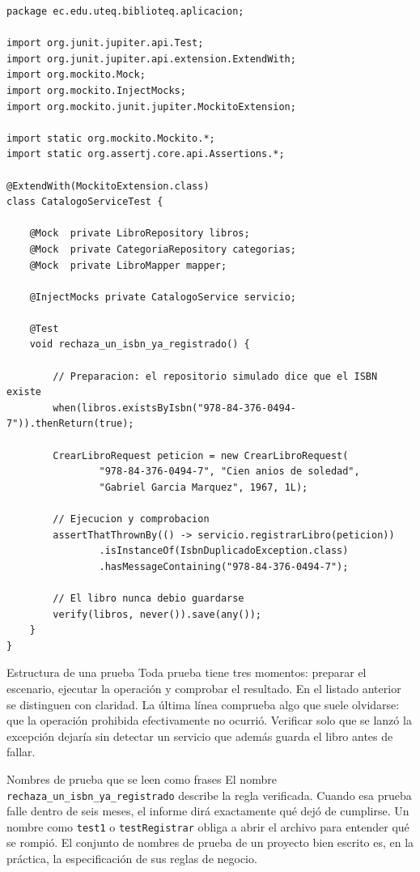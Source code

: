 \documentclass[11pt,a4paper,openany]{book}
\begin{document}
\begin{lstlisting}[style=java,caption={Prueba unitaria de la regla del ISBN duplicado.},label={lst:prueba-servicio}]
package ec.edu.uteq.biblioteq.aplicacion;

import org.junit.jupiter.api.Test;
import org.junit.jupiter.api.extension.ExtendWith;
import org.mockito.Mock;
import org.mockito.InjectMocks;
import org.mockito.junit.jupiter.MockitoExtension;

import static org.mockito.Mockito.*;
import static org.assertj.core.api.Assertions.*;

@ExtendWith(MockitoExtension.class)
class CatalogoServiceTest {

	@Mock  private LibroRepository libros;
	@Mock  private CategoriaRepository categorias;
	@Mock  private LibroMapper mapper;

	@InjectMocks private CatalogoService servicio;

	@Test
	void rechaza_un_isbn_ya_registrado() {

		// Preparacion: el repositorio simulado dice que el ISBN existe
		when(libros.existsByIsbn("978-84-376-0494-7")).thenReturn(true);

		CrearLibroRequest peticion = new CrearLibroRequest(
				"978-84-376-0494-7", "Cien anios de soledad",
				"Gabriel Garcia Marquez", 1967, 1L);

		// Ejecucion y comprobacion
		assertThatThrownBy(() -> servicio.registrarLibro(peticion))
				.isInstanceOf(IsbnDuplicadoException.class)
				.hasMessageContaining("978-84-376-0494-7");

		// El libro nunca debio guardarse
		verify(libros, never()).save(any());
	}
}
\end{lstlisting}

\begin{cajadefinicion}{Estructura de una prueba}
	Toda prueba tiene tres momentos: preparar el escenario, ejecutar la operación y comprobar el resultado. En el listado anterior se distinguen con claridad. La última línea comprueba algo que suele olvidarse: que la operación prohibida efectivamente no ocurrió. Verificar solo que se lanzó la excepción dejaría sin detectar un servicio que además guarda el libro antes de fallar.
\end{cajadefinicion}

\begin{cajabuenas}{Nombres de prueba que se leen como frases}
	El nombre \texttt{rechaza\_un\_isbn\_ya\_registrado} describe la regla verificada. Cuando esa prueba falle dentro de seis meses, el informe dirá exactamente qué dejó de cumplirse. Un nombre como \texttt{test1} o \texttt{testRegistrar} obliga a abrir el archivo para entender qué se rompió. El conjunto de nombres de prueba de un proyecto bien escrito es, en la práctica, la especificación de sus reglas de negocio.
\end{cajabuenas}
\end{document}
